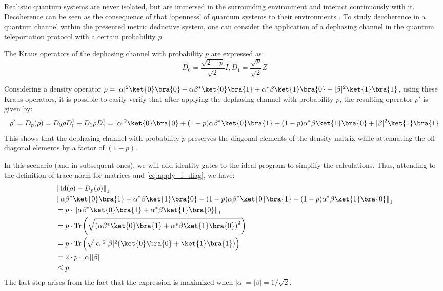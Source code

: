 \begin{example}
     Realistic quantum systems are never isolated, but are immersed in the surrounding environment and interact continuously with it. Decoherence can be seen as the consequence of that  `openness' of quantum systems to their  environments .  To study decoherence in a quantum channel within the presented metric deductive system, one can consider the application of a dephasing channel in the quantum teleportation protocol with a certain probability $p$.
     
     The Kraus operators of the dephasing channel with probability $p$ are expressed as:
     \begin{equation*}
          D_{0}= \frac{\sqrt{2-p}}{\sqrt{2}} I,  D_{1}= \frac{\sqrt{p}}{\sqrt{2}} Z
     \end{equation*}
     
     Considering a density operator $\rho=|\alpha|^{2} \ket{0} \bra{0} + \alpha \beta^{*} \ket{0} \bra{1}+ \alpha^{*} \beta \ket{1} \bra{0} + |\beta|^{2} \ket{1} \bra{1}$, using these Kraus operators, it is possible to easily verify  that after applying the dephasing channel with probability $p$, the resulting operator $\rho'$ is given by: 
     \begin{equation*} 
          \rho' = D_p(\rho)= D_{0} \rho D_{0}^{\dag} + D_{1} \rho D_{1}^{\dag} = |\alpha|^{2} \ket{0} \bra{0} +  (1-p) \alpha \beta^{*} \ket{0} \bra{1}+  (1-p) \alpha^{*}  \beta \ket{1} \bra{0} + |\beta|^{2} \ket{1} \bra{1}
     \end{equation*}
     This shows that the dephasing channel with probability $p$ preserves the diagonal elements of the density matrix while attenuating the off-diagonal elements by a factor of $(1-p)$.

     In this scenario (and in subsequent ones), we will add identity gates to the ideal program to simplify the calculations. Thus, attending to the definition of trace norm for matrices and \autoref{eq:apply_f_diag}, we have:
     \begin{align*}
      & \tracenorm{ \id(\rho) - D_{p}(\rho)} \\
      & \tracenorm{ \alpha \beta^{*} \ket{0} \bra{1}+ \alpha^{*} \beta \ket{1} \bra{0}  -   (1-p) \alpha \beta^{*} \ket{0} \bra{1}-  (1-p) \alpha^{*}  \beta \ket{1} \bra{0} } \\
      & = p \cdot  \tracenorm{ \alpha \beta^{*} \ket{0} \bra{1} + \alpha^{*}  \beta \ket{1} \bra{0} } \\
      & = p \cdot \tr \left(\sqrt{\left( \alpha \beta^{*} \ket{0} \bra{1} + \alpha^{*}  \beta \ket{1} \bra{0} \right)^2} \right) \\
      & = p \cdot  \tr \left(\sqrt{|\alpha|^{2}|\beta|^{2} (\ket{0} \bra{0}+ \ket{1} \bra{1})  } \right) \\
      & = 2 \cdot p \cdot |\alpha||\beta| \\
      & \leq p \\
     \end{align*}
     The last step arises from the fact that the expression is maximized when $|\alpha|=|\beta|=1/\sqrt{2}$.


\end{example}
